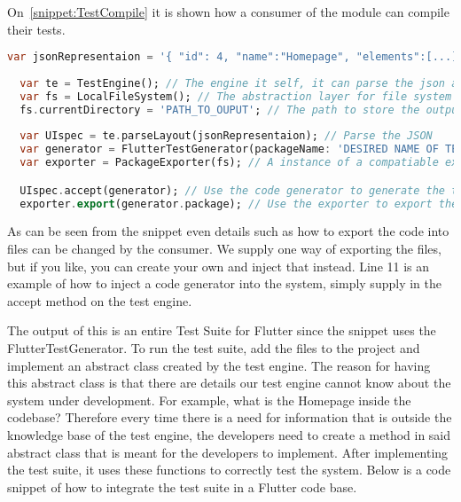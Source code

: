 On~\autoref{snippet:TestCompile} it is shown how a consumer of the module can compile their tests.

\begin{lstlisting}[language=dart, caption={How to configure and use the Test Generator Package.}, label={snippet:TestCompile}]
  var jsonRepresentaion = '{ "id": 4, "name":"Homepage", "elements":[...]}'; //The output from the Mobile application
  
  var te = TestEngine(); // The engine it self, it can parse the json and use a codegenerator
  var fs = LocalFileSystem(); // The abstraction layer for file system
  fs.currentDirectory = 'PATH_TO_OUPUT'; // The path to store the output test suite
  
  var UIspec = te.parseLayout(jsonRepresentaion); // Parse the JSON
  var generator = FlutterTestGenerator(packageName: 'DESIRED NAME OF TEST PACKAGE'); // An instance of a compatiable code generator
  var exporter = PackageExporter(fs); // A instance of a compatiable exporter.

  UIspec.accept(generator); // Use the code generator to generate the test suite
  exporter.export(generator.package); // Use the exporter to export the test suite to the file system.
\end{lstlisting}

As can be seen from the snippet even details such as how to export the code into files can be changed by the consumer. 
We supply one way of exporting the files, but if you like, you can create your own and inject that instead. 
Line 11 is an example of how to inject a code generator into the system, simply supply in the accept method on the test engine.

The output of this is an entire Test Suite for Flutter since the snippet uses the FlutterTestGenerator. 
To run the test suite, add the files to the project and implement an abstract class created by the test engine. 
The reason for having this abstract class is that there are details our test engine cannot know about the system under development.
For example, what is the Homepage inside the codebase?
Therefore every time there is a need for information that is outside the knowledge base of the test engine, the developers need to create a method in said abstract class that is meant for the developers to implement. 
After implementing the test suite, it uses these functions to correctly test the system.
Below is a code snippet of how to integrate the test suite in a Flutter code base.

